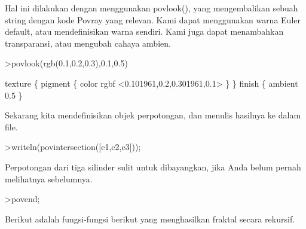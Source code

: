 \documentclass{article}
\begin{document}
\begin{eulernotebook}
\begin{eulercomment}
Hal ini dilakukan dengan menggunakan povlook(), yang mengembalikan
sebuah string dengan kode Povray yang relevan. Kami dapat menggunakan
warna Euler default, atau mendefinisikan warna sendiri. Kami juga
dapat menambahkan transparansi, atau mengubah cahaya ambien.
\end{eulercomment}
\begin{eulerprompt}
>povlook(rgb(0.1,0.2,0.3),0.1,0.5)
\end{eulerprompt}
\begin{euleroutput}
   texture \{ pigment \{ color rgbf <0.101961,0.2,0.301961,0.1> \}  \} 
   finish \{ ambient 0.5 \} 
  
\end{euleroutput}
\begin{eulercomment}
Sekarang kita mendefinisikan objek perpotongan, dan menulis hasilnya
ke dalam file.
\end{eulercomment}
\begin{eulerprompt}
>writeln(povintersection([c1,c2,c3]));
\end{eulerprompt}
\begin{eulercomment}
Perpotongan dari tiga silinder sulit untuk dibayangkan, jika Anda
belum pernah melihatnya sebelumnya.
\end{eulercomment}
\begin{eulerprompt}
>povend;
\end{eulerprompt}
\begin{eulercomment}
Berikut adalah fungsi-fungsi berikut yang menghasilkan fraktal secara
rekursif.


\end{eulercomment}
\end{eulernotebook}
\end{document}
